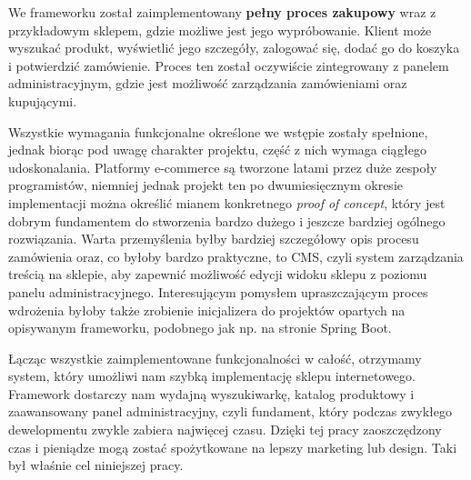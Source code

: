 We frameworku został zaimplementowany \textbf{pełny proces zakupowy} wraz z przykładowym sklepem, gdzie możliwe jest jego wypróbowanie. Klient może wyszukać produkt, wyświetlić jego szczegóły, zalogować się, dodać go do koszyka i potwierdzić zamówienie. Proces ten został oczywiście zintegrowany z panelem administracyjnym, gdzie jest możliwość zarządzania zamówieniami oraz kupującymi.

Wszystkie wymagania funkcjonalne określone we wstępie zostały spełnione, jednak biorąc pod uwagę charakter projektu, część z nich wymaga ciągłego udoskonalania. Platformy e-commerce są tworzone latami przez duże zespoły programistów, niemniej jednak projekt ten po dwumiesięcznym okresie implementacji można określić mianem konkretnego \textit{proof of concept}, który jest dobrym fundamentem do stworzenia bardzo dużego i jeszcze bardziej ogólnego rozwiązania. Warta przemyślenia byłby bardziej szczegółowy opis procesu zamówienia oraz, co byłoby bardzo praktyczne, to CMS, czyli system zarządzania treścią na sklepie, aby zapewnić możliwość edycji widoku sklepu z poziomu panelu administracyjnego. Interesującym pomysłem upraszczającym proces wdrożenia byłoby także zrobienie inicjalizera do projektów opartych na opisywanym frameworku, podobnego jak np. na stronie Spring Boot. 

Łącząc wszystkie zaimplementowane funkcjonalności w całość, otrzymamy system, który umożliwi nam szybką implementację sklepu internetowego. Framework dostarczy nam wydajną wyszukiwarkę, katalog produktowy i zaawansowany panel administracyjny, czyli fundament, który podczas zwykłego dewelopmentu zwykle zabiera najwięcej czasu. Dzięki tej pracy zaoszczędzony czas i pieniądze mogą zostać spożytkowane na lepszy marketing lub design. Taki był właśnie cel niniejszej pracy.  





